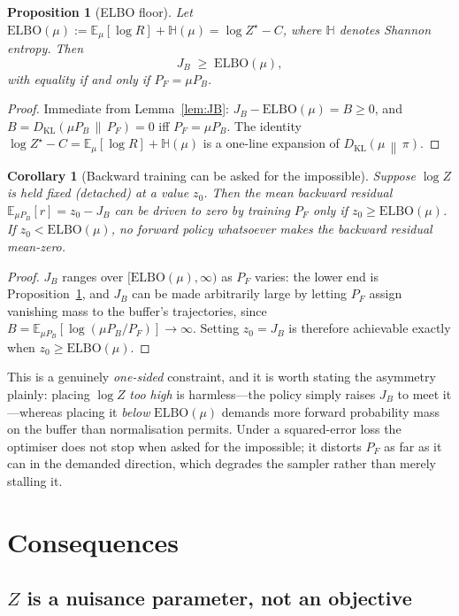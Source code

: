 \documentclass[11pt]{article}
\theoremstyle{plain}
\newtheorem{proposition}[theorem]{Proposition}
\newtheorem{corollary}[theorem]{Corollary}
\theoremstyle{definition}
\theoremstyle{remark}
\newcommand{\KL}[2]{D_{\mathrm{KL}}\!\left(#1 \,\middle\|\, #2\right)}
\newcommand{\E}[2]{\mathbb{E}_{#1}\!\left[#2\right]}
\newcommand{\PF}{P_{F}}
\newcommand{\PB}{P_{B}}
\newcommand{\Zstar}{Z^{\star}}
\newcommand{\JB}{J_{B}}
\newcommand{\ent}{\mathbb{H}}
\begin{document}
\begin{proposition}[ELBO floor]\label{prop:floor}
Let $\mathrm{ELBO}(\mu) := \E{\mu}{\log R} + \ent(\mu) = \log\Zstar - C$, where
$\ent$ denotes Shannon entropy. Then
\[
  \JB \;\ge\; \mathrm{ELBO}(\mu),
\]
with equality if and only if $\PF = \mu\PB$.
\end{proposition}
\begin{proof}
Immediate from Lemma~\ref{lem:JB}: $\JB - \mathrm{ELBO}(\mu) = B \ge 0$, and
$B = \KL{\mu\PB}{\PF} = 0$ iff $\PF = \mu\PB$. The identity
$\log\Zstar - C = \E{\mu}{\log R} + \ent(\mu)$ is a one-line expansion of
$\KL{\mu}{\pi}$.
\end{proof}

\begin{corollary}[Backward training can be asked for the impossible]\label{cor:impossible}
Suppose $\log Z$ is held fixed (detached) at a value $z_0$. Then the mean backward
residual $\E{\mu\PB}{r} = z_0 - \JB$ can be driven to zero by training $\PF$ only
if $z_0 \ge \mathrm{ELBO}(\mu)$. If $z_0 < \mathrm{ELBO}(\mu)$, no forward policy
whatsoever makes the backward residual mean-zero.
\end{corollary}
\begin{proof}
$\JB$ ranges over $[\mathrm{ELBO}(\mu), \infty)$ as $\PF$ varies: the lower end is
Proposition~\ref{prop:floor}, and $\JB$ can be made arbitrarily large by letting
$\PF$ assign vanishing mass to the buffer's trajectories, since
$B = \E{\mu\PB}{\log(\mu\PB/\PF)} \to \infty$. Setting $z_0 = \JB$ is therefore
achievable exactly when $z_0 \ge \mathrm{ELBO}(\mu)$.
\end{proof}

This is a genuinely \emph{one-sided} constraint, and it is worth stating the
asymmetry plainly: placing $\log Z$ \emph{too high} is harmless---the policy
simply raises $\JB$ to meet it---whereas placing it \emph{below} $\mathrm{ELBO}(\mu)$
demands more forward probability mass on the buffer than normalisation permits.
Under a squared-error loss the optimiser does not stop when asked for the
impossible; it distorts $\PF$ as far as it can in the demanded direction, which
degrades the sampler rather than merely stalling it.

\section{Consequences}

\subsection{$Z$ is a nuisance parameter, not an objective}
\end{document}
